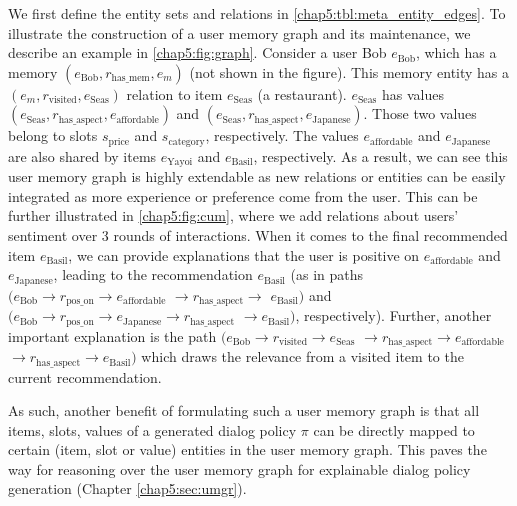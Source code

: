We first define the entity sets and relations in \ref{chap5:tbl:meta_entity_edges}.
To illustrate the construction of a user memory graph and its maintenance, we describe an example in \ref{chap5:fig:graph}.
Consider a user Bob $e_\text{Bob}$, which has a memory $(e_\text{Bob}, r_{\text{has\_mem}}, e_m)$ (not shown in the figure).
This memory entity has a $(e_m, r_{\text{visited}}, e_\text{Seas})$ relation to item $e_\text{Seas}$ (a restaurant).
$e_\text{Seas}$ has values $(e_\text{Seas}, r_{\text{has\_aspect}}, e_\text{affordable})$ and $(e_\text{Seas}, r_{\text{has\_aspect}}, e_\text{Japanese})$.
Those two values belong to slots $s_\text{price}$ and $s_\text{category}$, respectively.
The values $e_\text{affordable}$ and $e_\text{Japanese}$ are also shared by items $e_\text{Yayoi}$ and $e_\text{Basil}$, respectively.
As a result, we can see this user memory graph is highly extendable as new relations or entities can be easily integrated as more experience or preference come from the user. This can be further illustrated in \ref{chap5:fig:cum}, where we add relations about users' sentiment over 3 rounds of interactions.
When it comes to the final recommended item $e_{\text{Basil}}$, we can provide explanations that the user is positive on $e_\text{affordable}$ and $e_\text{Japanese}$, leading to the recommendation $e_\text{Basil}$ (as in paths $(e_\text{Bob} \rightarrow r_\text{pos\_on} \rightarrow e_\text{affordable}$ $\rightarrow r_\text{has\_aspect} \rightarrow$ $e_\text{Basil})$ and $(e_\text{Bob} \rightarrow r_\text{pos\_on} \rightarrow e_\text{Japanese} \rightarrow r_\text{has\_aspect} $ $\rightarrow e_\text{Basil})$, respectively). Further, another important explanation is the path $(e_\text{Bob} \rightarrow r_\text{visited} \rightarrow e_\text{Seas}$ $\rightarrow r_\text{has\_aspect} \rightarrow e_\text{affordable}$ $\rightarrow r_\text{has\_aspect} \rightarrow e_\text{Basil})$ which draws the relevance from a visited item to the current recommendation. 

As such, another benefit of formulating such a user memory graph is that all items, slots, values of a generated dialog policy $\pi$ can be directly mapped to certain (item, slot or value) entities in the user memory graph.
This paves the way for reasoning over the user memory graph for explainable dialog policy generation (Chapter \ref{chap5:sec:umgr}). 

